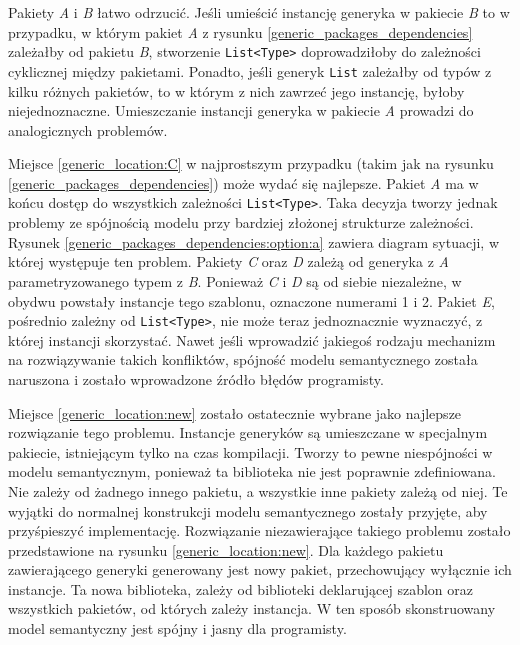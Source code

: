 Pakiety \emph{A} i \emph{B} łatwo odrzucić.
Jeśli umieścić instancję generyka w pakiecie \emph{B} to w przypadku, w którym pakiet \emph{A} z rysunku \ref{generic_packages_dependencies} zależałby od pakietu \emph{B}, stworzenie \lstinline{List<Type>} doprowadziłoby do zależności cyklicznej między pakietami.
Ponadto, jeśli generyk \lstinline{List} zależałby od typów z kilku różnych pakietów, to w którym z nich zawrzeć jego instancję, byłoby niejednoznaczne.
Umieszczanie instancji generyka w pakiecie \emph{A} prowadzi do analogicznych problemów.

Miejsce \ref{generic_location:C} w najprostszym przypadku (takim jak na rysunku \ref{generic_packages_dependencies}) może wydać się najlepsze.
Pakiet \emph{A} ma w końcu dostęp do wszystkich zależności \lstinline{List<Type>}.
Taka decyzja tworzy jednak problemy ze spójnością modelu przy bardziej złożonej strukturze zależności.
Rysunek \ref{generic_packages_dependencies:option:a} zawiera diagram sytuacji, w której występuje ten problem.
Pakiety \emph{C} oraz \emph{D} zależą od generyka z \emph{A} parametryzowanego typem z \emph{B}.
Ponieważ \emph{C} i \emph{D} są od siebie niezależne, w obydwu powstały instancje tego szablonu, oznaczone numerami 1 i 2.
Pakiet \emph{E}, pośrednio zależny od \lstinline{List<Type>}, nie może teraz jednoznacznie wyznaczyć, z której instancji skorzystać.
Nawet jeśli wprowadzić jakiegoś rodzaju mechanizm na rozwiązywanie takich konfliktów, spójność modelu semantycznego została naruszona i zostało wprowadzone źródło błędów programisty.

Miejsce \ref{generic_location:new} zostało ostatecznie wybrane jako najlepsze rozwiązanie tego problemu.
Instancje generyków są umieszczane w specjalnym pakiecie, istniejącym tylko na czas kompilacji.
Tworzy to pewne niespójności w modelu semantycznym, ponieważ ta biblioteka nie jest poprawnie zdefiniowana.
Nie zależy od żadnego innego pakietu, a wszystkie inne pakiety zależą od niej.
Te wyjątki do normalnej konstrukcji modelu semantycznego zostały przyjęte, aby przyśpieszyć implementację.
Rozwiązanie niezawierające takiego problemu zostało przedstawione na rysunku \ref{generic_location:new}.
Dla każdego pakietu zawierającego generyki generowany jest nowy pakiet, przechowujący wyłącznie ich instancje.
Ta nowa biblioteka, zależy od biblioteki deklarującej szablon oraz wszystkich pakietów, od których zależy instancja.
W ten sposób skonstruowany model semantyczny jest spójny i jasny dla programisty.


